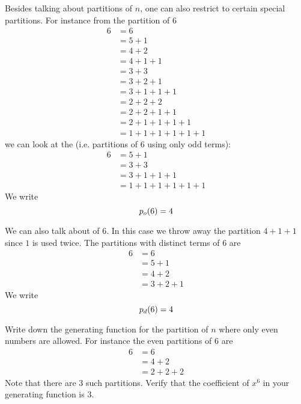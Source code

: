 Besides talking about partitions of $n$,
one can also restrict to certain special partitions.
For instance from the partition of 6
\begin{align*}
6
&= 6 \\
&= 5 + 1\\
&= 4 + 2 \\
&= 4 + 1 + 1 \\
&= 3 + 3 \\
&= 3 + 2 + 1 \\
&= 3 + 1 + 1 + 1 \\
&= 2 + 2 + 2 \\
&= 2 + 2 + 1 + 1 \\
&= 2 + 1 + 1 + 1 + 1 \\
&= 1 + 1 + 1 + 1 + 1 + 1 
\end{align*}
we can look at the  (i.e. partitions of $6$ using only odd terms):
\begin{align*}
6
&= 5 + 1\\
&= 3 + 3 \\
&= 3 + 1 + 1 + 1 \\
&= 1 + 1 + 1 + 1 + 1 + 1 
\end{align*}
We write
\[
p_o(6) = 4\index{p0@$p_0(n)$}
\]

We can also talk about  of $6$.
In this case we throw away the partition $4 + 1 + 1$ since $1$ is used twice.
The partitions with distinct terms of 6 are
\begin{align*}
6
&= 6 \\
&= 5 + 1\\
&= 4 + 2 \\
&= 3 + 2 + 1 
\end{align*}
We write
\[
p_d(6) = 4\index{pd@$p_d(n)$}
\]


\newpage
\begin{ex}
Write down the generating function for the partition of $n$ where
only even numbers are allowed.
For instance the even partitions of 6 are
\begin{align*}
6
&= 6 \\
&= 4 + 2 \\
&= 2 + 2 + 2 
\end{align*}
Note that there are 3 such partitions.
Verify that the coefficient of $x^6$ in your generating function is 3.
\end{ex}


